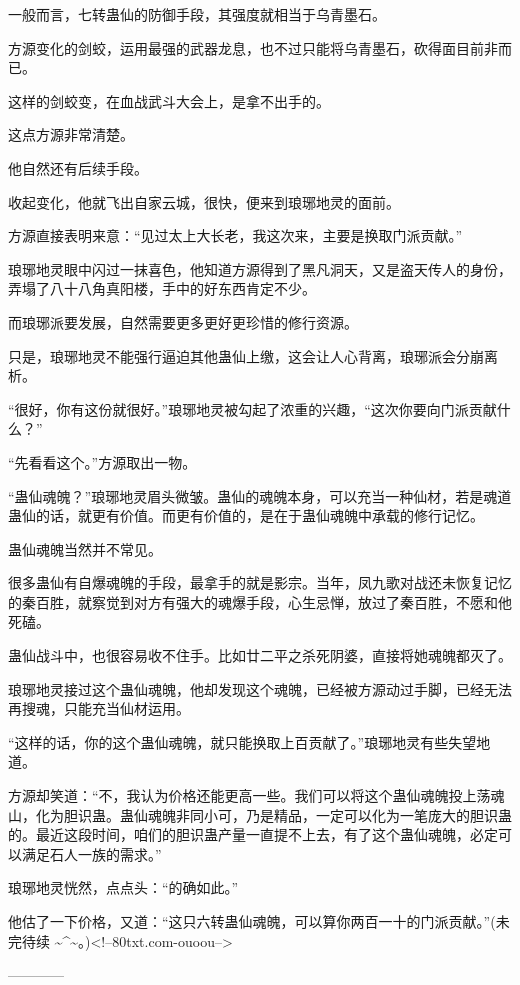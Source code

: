 \begin{this_body}
一般而言，七转蛊仙的防御手段，其强度就相当于乌青墨石。

方源变化的剑蛟，运用最强的武器龙息，也不过只能将乌青墨石，砍得面目前非而已。

这样的剑蛟变，在血战武斗大会上，是拿不出手的。

这点方源非常清楚。

他自然还有后续手段。

收起变化，他就飞出自家云城，很快，便来到琅琊地灵的面前。

方源直接表明来意：“见过太上大长老，我这次来，主要是换取门派贡献。”

琅琊地灵眼中闪过一抹喜色，他知道方源得到了黑凡洞天，又是盗天传人的身份，弄塌了八十八角真阳楼，手中的好东西肯定不少。

而琅琊派要发展，自然需要更多更好更珍惜的修行资源。

只是，琅琊地灵不能强行逼迫其他蛊仙上缴，这会让人心背离，琅琊派会分崩离析。

“很好，你有这份就很好。”琅琊地灵被勾起了浓重的兴趣，“这次你要向门派贡献什么？”

“先看看这个。”方源取出一物。

“蛊仙魂魄？”琅琊地灵眉头微皱。蛊仙的魂魄本身，可以充当一种仙材，若是魂道蛊仙的话，就更有价值。而更有价值的，是在于蛊仙魂魄中承载的修行记忆。

蛊仙魂魄当然并不常见。

很多蛊仙有自爆魂魄的手段，最拿手的就是影宗。当年，凤九歌对战还未恢复记忆的秦百胜，就察觉到对方有强大的魂爆手段，心生忌惮，放过了秦百胜，不愿和他死磕。

蛊仙战斗中，也很容易收不住手。比如廿二平之杀死阴婆，直接将她魂魄都灭了。

琅琊地灵接过这个蛊仙魂魄，他却发现这个魂魄，已经被方源动过手脚，已经无法再搜魂，只能充当仙材运用。

“这样的话，你的这个蛊仙魂魄，就只能换取上百贡献了。”琅琊地灵有些失望地道。

方源却笑道：“不，我认为价格还能更高一些。我们可以将这个蛊仙魂魄投上荡魂山，化为胆识蛊。蛊仙魂魄非同小可，乃是精品，一定可以化为一笔庞大的胆识蛊的。最近这段时间，咱们的胆识蛊产量一直提不上去，有了这个蛊仙魂魄，必定可以满足石人一族的需求。”

琅琊地灵恍然，点点头：“的确如此。”

他估了一下价格，又道：“这只六转蛊仙魂魄，可以算你两百一十的门派贡献。”(未完待续 \~{}\^{}\~{}。)<!--80txt.com-ouoou-->

------------

\end{this_body}

